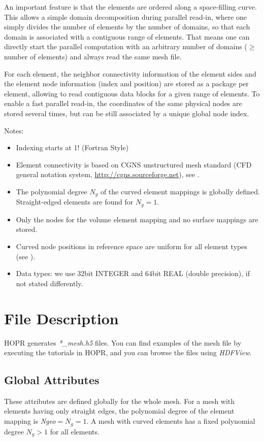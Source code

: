 \documentclass[a4paper,headsepline]{scrreprt}
\newcommand\rf[1]{\prettyref{#1}}
\newcommand\Ngeo{N_g}
\begin{document}
An important feature is that the elements are ordered along a space-filling curve. This allows a simple domain decomposition during parallel read-in, where one simply divides the number of elements by the number of domains, so that each domain is associated with a contiguous range of elements. That means one can directly start the parallel computation with an arbitrary number of domains ($\geq$ number of elements) and always read the same  mesh file. 

For each element,  the neighbor connectivity information of the element sides and the element node information (index and position) are stored as a package per element, allowing to read contiguous data blocks for a given range of elements. To enable a fast parallel read-in, the coordinates of the same physical nodes are stored several times, but can be still associated by a unique global node index. 

Notes:\\
\begin{itemize}
 \item  Indexing starts at 1! (Fortran Style)
 \item  Element connectivity is based on CGNS unstructured mesh standard (CFD general notation system, \url{http://cgns.sourceforge.net}), see \rf{sec:CGNS}.
 \item  The polynomial degree $\Ngeo$ of the curved element mappings is globally defined. Straight-edged elements are found for $\Ngeo=1$.
 \item  Only the nodes for the volume element mapping and no surface mappings are stored.
 \item  Curved node positions in reference space are uniform for all element types (see \rf{sec:elemnodes}).
 \item  Data types: we use 32bit INTEGER and 64bit REAL (double precision), if not stated differently.
\end{itemize}



\chapter{File Description}
HOPR generates \emph{*\_mesh.h5} files. You can find examples of the mesh file by executing the tutorials in HOPR, and you can browse the files using \emph{HDFView}.

\section{Global Attributes}
\label{sec:globals}
These attributes are defined globally for the whole mesh. For a mesh with elements having only straight edges, the polynomial degree of the element mapping is \textit{Ngeo}$=\Ngeo=1$.  A mesh with curved elements has a fixed polynomial degree $\Ngeo>1$ for all elements. 
\end{document}
